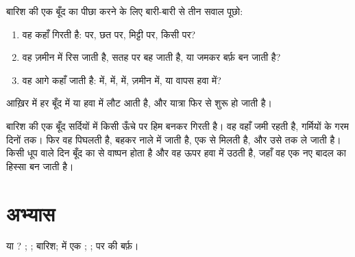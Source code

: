 \begin{method}[बारिश की एक बूँद का पीछा करना]\label{met:g2:water-on-earth:drop}
बारिश की एक बूँद का पीछा करने के लिए बारी-बारी से तीन सवाल पूछो:
\begin{enumerate}
  \item वह कहाँ गिरती है:  पर, छत पर, मिट्टी पर, किसी  पर?
  \item वह ज़मीन में रिस जाती है, सतह पर बह जाती है, या जमकर बर्फ़ बन
        जाती है?
  \item वह आगे कहाँ जाती है:  में,  में,  में, ज़मीन में, या
        वापस हवा में?
\end{enumerate}
आख़िर में हर बूँद  में या हवा में लौट आती है, और यात्रा फिर से शुरू
हो जाती है।
\end{method}

\begin{example}[पर्वत पर एक बूँद]\label{ex:g2:water-on-earth:mountain}
बारिश की एक बूँद सर्दियों में किसी ऊँचे  पर हिम बनकर गिरती है। वह
वहाँ जमी रहती है, गर्मियों के गरम दिनों तक। फिर वह पिघलती है, बहकर
 नाले में जाती है, एक  से मिलती है, और  उसे  तक ले
जाती है। किसी धूप वाले दिन बूँद का  से वाष्पन होता है और वह ऊपर
हवा में उठती है, जहाँ वह एक नए बादल का हिस्सा बन जाती है।
\end{example}

\section{अभ्यास}

\begin{exercise}[$\star$]\label{exo:g2:water-on-earth:1}
 या ? ; ; बारिश;  में एक ; ;
 पर की बर्फ़।
\end{exercise}

